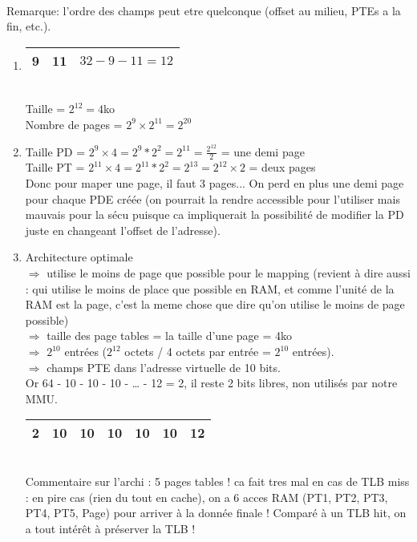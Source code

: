 \begin{enumerate}
\begin{correction}\\
Remarque: l’ordre des champs peut etre quelconque (offset au milieu, PTEs a la fin, etc.).
\begin{enumerate}[label=(\alph*)]
  \item \begin{tabular}{|c|c|c|} \hline 9 & 11 & $32-9-11=12$\tabularnewline \hline \end{tabular} \\
        Taille = $2^{12}=4$ko \\
        Nombre de pages = $2^{9}\times2^{11}=2^{20}$

  \item Taille PD = $2^{9}\times4=2^{9}*2^{2}=2^{11}=\frac{2^{12}}{2}$ = une demi page\\
        Taille PT = $2^{11}\times4=2^{11}*2^{2}=2^{13}=2^{12}\times2$ = deux pages\\
        Donc pour maper une page, il faut 3 pages... On perd en plus une demi
        page pour chaque PDE créée (on pourrait la rendre accessible pour
        l’utiliser mais mauvais pour la sécu puisque ca impliquerait la
        possibilité de modifier la PD juste en changeant l’offset de
        l’adresse).

  \item Architecture optimale\\
        $\Rightarrow$ utilise le moins de page que possible pour le mapping (revient à dire aussi : qui utilise le moins de place que possible en RAM, et comme l’unité de la RAM est la page, c’est la meme chose que dire qu’on utilise le moins de page possible)\\
        $\Rightarrow$ taille des page tables = la taille d’une page = 4ko\\
        $\Rightarrow$ $2^{10}$ entrées ($2^{12}$ octets / 4 octets par entrée = $2^{10}$ entrées).\\
        $\Rightarrow$ champs PTE dans l'adresse virtuelle de 10 bits.\\
        Or 64 - 10 - 10 - 10 - … - 12 = 2, il reste 2 bits libres, non utilisés par notre MMU.\\
        \begin{tabular}{|c|c|c|c|c|c|c|}
           \hline 2 & 10 & 10 & 10 & 10 & 10 & 12\tabularnewline \hline
        \end{tabular}\\
         Commentaire sur l’archi : 5 pages tables ! ca fait tres mal en cas de
         TLB miss : en pire cas (rien du tout en cache), on a 6 acces RAM (PT1,
         PT2, PT3, PT4, PT5, Page) pour arriver à la donnée finale ! Comparé à
         un TLB hit, on a tout intérêt à préserver la TLB !
\end{enumerate}
\end{correction}


\end{enumerate}
